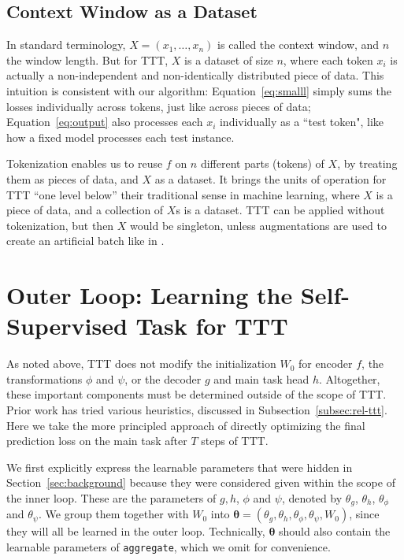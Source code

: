 \documentclass{article}
\begin{document}
\subsection{Context Window as a Dataset}
\label{subsec:context}
In standard terminology, $X = (x_1, \dots, x_n)$ is called the context window, and $n$ the window length.
But for TTT, $X$ is a dataset of size $n$, where each token $x_i$ is actually a non-independent and non-identically distributed piece of data.
This intuition is consistent with our algorithm: Equation~\ref{eq:smalll} simply sums the losses individually across tokens, just like across pieces of data;
Equation~\ref{eq:output} also processes each $x_i$ individually as a ``test token", like how a fixed model processes each test instance.

 
Tokenization enables us to reuse $f$ on $n$ different parts (tokens) of $X$, by treating them as pieces of data, and $X$ as a dataset.
It brings the units of operation for TTT ``one level below'' their traditional sense in machine learning, where $X$ is a piece of data, and a collection of $X$s is a dataset.
TTT can be applied without tokenization, but then $X$ would be singleton, unless augmentations are used to create an artificial batch like in \cite{sun2020test}.

\section{Outer Loop: Learning the Self-Supervised Task for TTT}
\label{sec:method}
As noted above, TTT does not modify 
the initialization $W_0$ for encoder $f$, 
the transformations $\phi$ and $\psi$, or the decoder $g$ and main task head $h$.
Altogether, these important components must be determined outside of the scope of TTT.
Prior work has tried various heuristics, discussed in Subsection~\ref{subsec:rel-ttt}.
Here we take the more principled approach of directly optimizing the final prediction loss on the main task after $T$ steps of TTT.

We first explicitly express the learnable parameters that were hidden in Section~\ref{sec:background} because they were considered given within the scope of the inner loop.
These are the parameters of $g, h$, $\phi$ and $\psi$, denoted by $\theta_g$, $\theta_h$, $\theta_\phi$ and $\theta_\psi$. 
We group them together with $W_0$ into $\boldsymbol{\theta} = (\theta_g, \theta_h, \theta_\phi, \theta_\psi, W_0)$, since they will all be learned in the outer loop.
Technically, $\boldsymbol{\theta}$ should also contain the learnable parameters of \texttt{aggregate}, which we omit for convenience.
\end{document}
